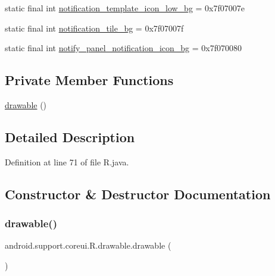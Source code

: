 \begin{DoxyCompactItemize}
\item 
static final int \mbox{\hyperlink{classandroid_1_1support_1_1coreui_1_1_r_1_1drawable_a6aa5ebe8043d2f7155705c4988e46024}{notification\+\_\+template\+\_\+icon\+\_\+low\+\_\+bg}} = 0x7f07007e
\item 
static final int \mbox{\hyperlink{classandroid_1_1support_1_1coreui_1_1_r_1_1drawable_aa40d9d7403b9046f03181c7e8fa6b217}{notification\+\_\+tile\+\_\+bg}} = 0x7f07007f
\item 
static final int \mbox{\hyperlink{classandroid_1_1support_1_1coreui_1_1_r_1_1drawable_a8fad725edb38a205968e9df2ec8754fc}{notify\+\_\+panel\+\_\+notification\+\_\+icon\+\_\+bg}} = 0x7f070080
\end{DoxyCompactItemize}
\subsection*{Private Member Functions}
\begin{DoxyCompactItemize}
\item 
\mbox{\hyperlink{classandroid_1_1support_1_1coreui_1_1_r_1_1drawable_a237196404e1e1cdbc494a627d070e74b}{drawable}} ()
\end{DoxyCompactItemize}


\subsection{Detailed Description}


Definition at line 71 of file R.\+java.



\subsection{Constructor \& Destructor Documentation}
\mbox{\label{classandroid_1_1support_1_1coreui_1_1_r_1_1drawable_a237196404e1e1cdbc494a627d070e74b}} 
\subsubsection{\texorpdfstring{drawable()}{drawable()}}
{\footnotesize\ttfamily android.\+support.\+coreui.\+R.\+drawable.\+drawable (\begin{DoxyParamCaption}{ }\end{DoxyParamCaption})\hspace{0.3cm}{\ttfamily [private]}}



